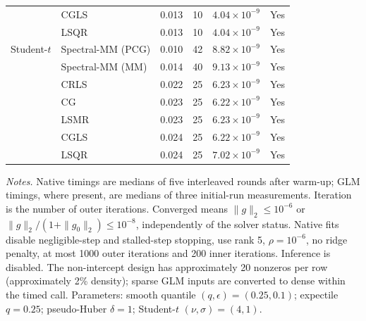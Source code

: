 \documentclass[10pt,a4paper]{article}
\begin{document}
\begin{longtable}{llrrrc}
 & CGLS & 0.013 & 10 & $4.04\times10^{-9}$ & Yes \\
 & LSQR & 0.013 & 10 & $4.04\times10^{-9}$ & Yes \\
\midrule
Student-$t$ & Spectral-MM (PCG) & 0.010 & 42 & $8.82\times10^{-9}$ & Yes \\
 & Spectral-MM (MM) & 0.014 & 40 & $9.13\times10^{-9}$ & Yes \\
 & CRLS & 0.022 & 25 & $6.23\times10^{-9}$ & Yes \\
 & CG & 0.023 & 25 & $6.22\times10^{-9}$ & Yes \\
 & LSMR & 0.023 & 25 & $6.23\times10^{-9}$ & Yes \\
 & CGLS & 0.024 & 25 & $6.22\times10^{-9}$ & Yes \\
 & LSQR & 0.024 & 25 & $7.02\times10^{-9}$ & Yes \\
\end{longtable}
\noindent\textit{Notes.} Native timings are medians of five interleaved rounds after warm-up; GLM timings, where present, are medians of three initial-run measurements. Iteration is the number of outer iterations. Converged means $\|g\|_2\leq10^{-6}$ or $\|g\|_2/(1+\|g_0\|_2)\leq10^{-8}$, independently of the solver status. Native fits disable negligible-step and stalled-step stopping, use rank 5, $\rho=10^{-6}$, no ridge penalty, at most 1000 outer iterations and 200 inner iterations. Inference is disabled.
The non-intercept design has approximately 20 nonzeros per row (approximately 2\% density); sparse GLM inputs are converted to dense within the timed call.
Parameters: smooth quantile $(q,\epsilon)=(0.25,0.1)$; expectile $q=0.25$; pseudo-Huber $\delta=1$; Student-$t$ $(\nu,\sigma)=(4,1)$.
\par
\endgroup
\end{document}
